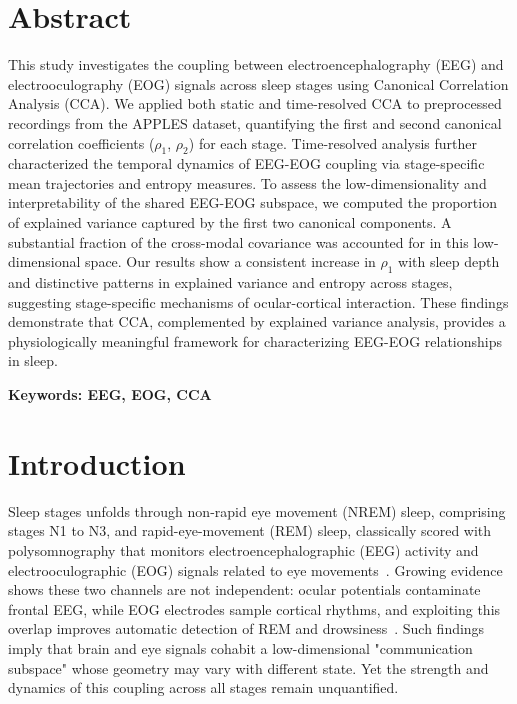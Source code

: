 



\maketitle

\section{Abstract}

This study investigates the coupling between electroencephalography (EEG) and electrooculography (EOG) signals across sleep stages using Canonical Correlation Analysis (CCA). We applied both static and time-resolved CCA to preprocessed recordings from the APPLES dataset, quantifying the first and second canonical correlation coefficients ($\rho_1$, $\rho_2$) for each stage. Time-resolved analysis further characterized the temporal dynamics of EEG-EOG coupling via stage-specific mean trajectories and entropy measures. To assess the low-dimensionality and interpretability of the shared EEG-EOG subspace, we computed the proportion of explained variance captured by the first two canonical components. A substantial fraction of the cross-modal covariance was accounted for in this low-dimensional space. Our results show a consistent increase in $\rho_1$ with sleep depth and distinctive patterns in explained variance and entropy across stages, suggesting stage-specific mechanisms of ocular-cortical interaction. These findings demonstrate that CCA, complemented by explained variance analysis, provides a physiologically meaningful framework for characterizing EEG-EOG relationships in sleep.

\textbf{Keywords: EEG, EOG, CCA}

\section{Introduction}

Sleep stages unfolds through non-rapid eye movement (NREM) sleep, comprising stages N1 to N3, and rapid-eye-movement (REM) sleep, classically scored with polysomnography that monitors electroencephalographic (EEG) activity and electrooculographic (EOG) signals related to eye movements~\cite{liu2021}. Growing evidence shows these two channels are not independent: ocular potentials contaminate frontal EEG, while EOG electrodes sample cortical rhythms, and exploiting this overlap improves automatic detection of REM and drowsiness~\cite{xu2025, safieddine2012}. Such findings imply that brain and eye signals cohabit a low-dimensional "communication subspace" whose geometry may vary with different state. Yet the strength and dynamics of this coupling across all stages remain unquantified.

